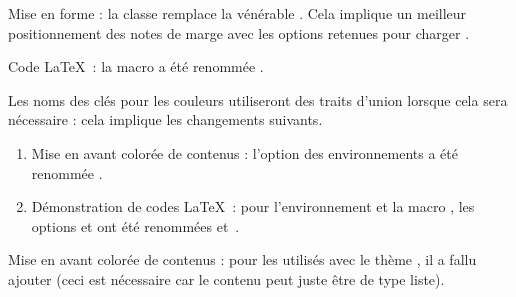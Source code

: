 \begin{tdocbreak}[version = 1.7.0, date = 2024-12-04]
	\item Mise en forme : la classe  remplace la vénérable . Cela implique un meilleur positionnement des notes de marge avec les options retenues pour charger .

	\item Code \LaTeX\ : la macro  a été renommée .

	\item Les noms des clés pour les couleurs utiliseront des traits d'union lorsque cela sera nécessaire : cela implique les changements suivants.
	\begin{enumerate}
		\item Mise en avant colorée de contenus : l'option  des environnements a été renommée .

		\item Démonstration de codes \LaTeX\ : pour l'environnement  et la macro , les options  et  ont été renommées  et \,.
	\end{enumerate}
\end{tdocbreak}


\begin{tdocfix}
	\item Mise en avant colorée de contenus : pour les  utilisés avec le thème , il a fallu ajouter  (ceci est nécessaire car le contenu peut juste être de type liste).
\end{tdocfix}


